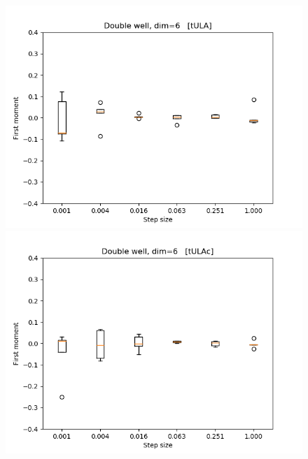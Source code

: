 \begin{figure}
\centering
  \begin{minipage}[b]{0.32\textwidth}
  \centering
    \includegraphics[width=\textwidth]{Figures/tula_fm.png}
  \end{minipage} %
  \begin{minipage}[b]{0.32\textwidth}
  \centering
    \includegraphics[width=\textwidth]{Figures/tulac_fm.png}
  \end{minipage} %
  \begin{minipage}[b]{0.32\textwidth}
  \centering

\end{minipage}
\end{figure}
